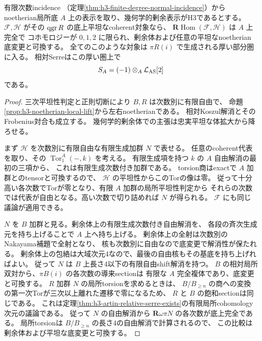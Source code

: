 \begin{theorem}\label{thm:h3-relative-flat-coherent-serre-local}
有限次数incidence
（定理\ref{thm:h3-finite-degree-normal-incidence}）から
noetherian局所底 $A$ 上の表示を取り、幾何学的剰余表示がH3であるとする。
$\mathcal F,\mathcal H$ がその $\operatorname{qgr} R$ の底上平坦なcoherent対象なら、
$\mathbf R\operatorname{Hom}(\mathcal F,\mathcal H)$ は $A$ 上完全で
コホモロジーが $0,1,2$ に限られ、剰余体および任意の平坦なnoetherian底変更と可換する。
全てのこのような対象は $\pi R(i)$ で生成される厚い部分圏に入る。
相対Serreはこの厚い圏上で
\[
 S_A=(-1)\otimes_A\mathcal L_{\rm AS}[2]
\]
である。
\end{theorem}
\begin{proof}
三次平坦性判定と正則切断により $B,R$ は次数別に有限自由で、
命題\ref{prop:h3-noetherian-local-lift}から左右noetherianである。
相対Koszul解消とそのFrobenius対合も成立する。
幾何学的剰余体での主張は忠実平坦な体拡大から降ろせる。

まず $\mathcal H$ を次数別に有限自由な有限生成加群 $N$ で表せる。
任意のcoherent代表を取り、その $\operatorname{Tor}_1^A(-,k)$ を考える。
有限生成項を持つ $k$ の $A$ 自由解消の最初の三項から、
これは有限生成次数付き加群である。
torsion商はexactで $A$ 加群とのtensorと可換するので、
$\mathcal H$ の平坦性からこのTorの像は零。
従って十分高い各次数でTorが零となり、有限 $A$ 加群の局所平坦性判定から
それらの次数では代表が自由となる。高い次数で切り詰めれば $N$ が得られる。
$\mathcal F$ にも同じ議論が適用できる。

$N$ を $B$ 加群と見る。剰余体上の有限生成次数付き自由解消を、
各段の斉次生成元を持ち上げることで $A$ 上へ持ち上げる。
剰余体上の全射は次数別のNakayama補題で全射となり、
核も次数別に自由なので底変更で解消性が保たれる。
剰余体上の包絡は大域次元4なので、最後の自由核もその基底を持ち上げればよい。
従って $N$ は $B$ 上長さ4以下の有限自由shift解消を持つ。
$B$ の相対局所双対から、$\pi B(i)$ の各次数の導来sectionは
有限な $A$ 完全複体であり、底変更と可換する。
$R$ 加群 $N$ の局所torsionを求めるときは、
$B/B_{\ge n}$ の商への変換の第一次Torが三次以上離れた遷移で零になるため、
$R$ と $B$ の飽和sectionは同じである。
これは定理\ref{thm:h3-artin-relative-serre-exists}の有限局所cohomology次元の議論である。
従って $N$ の自由解消から $\mathbf R\omega\pi N$ の各次数が底上完全である。
局所torsionは $B/B_{\ge n}$ の長さ4の自由解消で計算されるので、
この比較は剰余体および平坦な底変更と可換する。


\end{proof}
